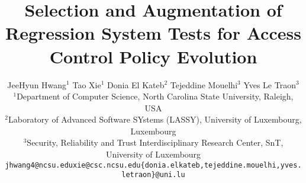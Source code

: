 \documentclass{acm_proc_article-sp}
\begin{document}
\title{Selection and Augmentation of Regression System Tests for Access Control Policy Evolution}
%
%
%
%
%

%

\author{
JeeHyun Hwang$^1$ \hspace*{0.15in} Tao Xie$^1$\hspace*{0.15in} Donia El Kateb$^2$ \hspace*{0.15in} Tejeddine Mouelhi$^3$  \hspace*{0.15in} Yves Le Traon$^3$\\
$^1$\small{Department of Computer Science, North Carolina State University, Raleigh, USA}\\
$^2$\small{Laboratory of Advanced Software SYstems (LASSY), University of Luxembourg, Luxembourg}\\
$^3$\small{Security, Reliability and Trust Interdisciplinary Research Center, SnT, University of Luxembourg}\\
\small{\texttt{jhwang4@ncsu.edu}}\hspace*{0.3in}\small{\texttt{xie@csc.ncsu.edu}}\hspace*{0.3in}\small{\texttt{\{donia.elkateb,tejeddine.mouelhi,yves.letraon\}@uni.lu}}\\
}
\end{document}

